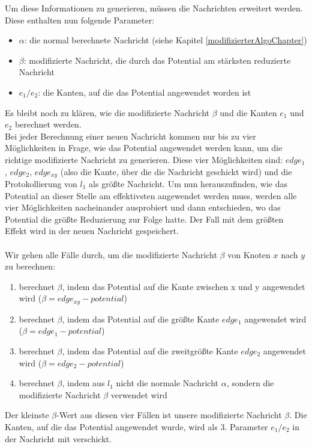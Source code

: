	Um diese Informationen zu generieren, müssen die Nachrichten erweitert werden.
	Diese enthalten nun folgende Parameter:
	\begin{itemize}
		\item $\alpha$: die normal berechnete Nachricht (siehe Kapitel \ref{modifizierterAlgoChapter})
		\item $\beta$: modifizierte Nachricht, die durch das Potential am stärksten reduzierte Nachricht
		\item $e_{1} / e_{2}$: die Kanten, auf die das Potential angewendet worden ist
	\end{itemize}
	Es bleibt noch zu klären, wie die modifizierte Nachricht $\beta$ und die Kanten $e_{1}$ und $e_{2}$ berechnet werden.\\
	Bei jeder Berechnung einer neuen Nachricht kommen nur bis zu vier Möglichkeiten in Frage, wie das Potential angewendet werden kann, um die richtige modifizierte Nachricht zu generieren. Diese vier Möglichkeiten sind: $edge_{1}$, $edge_{2}$, $edge_{xy}$ (also die Kante, über die die Nachricht geschickt wird) und die Protokollierung von $l_{1}$ als größte Nachricht. Um nun herauszufinden, wie das Potential an dieser Stelle am effektivsten angewendet werden muss, werden alle vier Möglichkeiten nacheinander ausprobiert und dann entschieden, wo das Potential die größte Reduzierung zur Folge hatte. Der Fall mit dem größten Effekt wird in der neuen Nachricht gespeichert.
	\\
	\\
	Wir gehen alle Fälle durch, um die modifizierte Nachricht $\beta$ von Knoten $x$ nach $y$ zu berechnen:
	\begin{enumerate}
		\item berechnet $\beta$, indem das Potential auf die Kante zwischen x und y angewendet wird ($\beta = edge_{xy} - potential$)
		\item berechnet $\beta$, indem das Potential auf die größte Kante $edge_{1}$ angewendet wird ($\beta = edge_{1} - potential$) 
		\item berechnet $\beta$, indem das Potential auf die zweitgrößte Kante $edge_{2}$ angewendet wird ($\beta = edge_{2} - potential$)
		\item berechnet $\beta$, indem aus $l_{1}$ nicht die normale Nachricht $\alpha$, sondern die modifizierte Nachricht $\beta$ verwendet wird
	\end{enumerate}
	Der kleinste $\beta$-Wert aus diesen vier Fällen ist unsere modifizierte Nachricht $\beta$. Die Kanten, auf die das Potential angewendet wurde, wird als 3. Parameter $e_{1} / e_{2}$ in der Nachricht mit verschickt.\\
